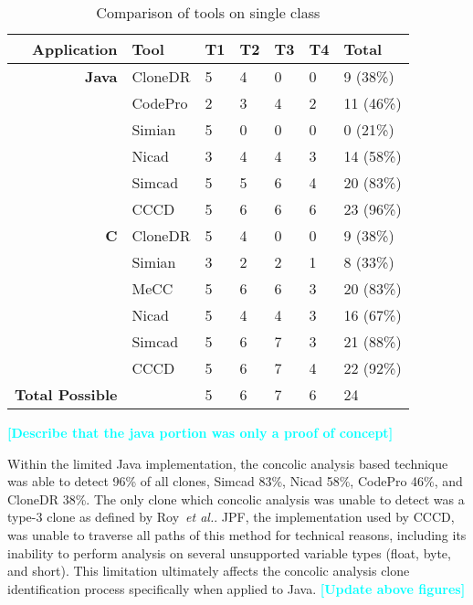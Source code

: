 \documentclass[smallextended]{svjour3}       %
\newcommand{\todo}[1]{\textcolor{cyan}{\textbf{[#1]}}}
\begin{document}
\begin{table}[thb!]
\begin{center}
\caption{Comparison of tools on single class}
\label{table:singleclasscomparisionexample}
\begin{tabular}{r||l|l|l|l|l|l}
\bfseries Application & \bfseries Tool & \bfseries T1 & \bfseries T2 & \bfseries T3 & \bfseries  T4 & \bfseries  Total \\ \hline\hline
  \bfseries Java & CloneDR & 5 & 4 & 0 & 0 & 9 (38\%) \\ \cline{2-7}
   & CodePro &  2 & 3 & 4 & 2 & 11 (46\%) \\ \cline{2-7}
& Simian &  5 & 0 & 0 & 0 & 0 (21\%) \\ \cline{2-7}
& Nicad &  3 & 4 & 4 & 3 & 14 (58\%) \\ \cline{2-7}
& Simcad &  5 & 5 & 6 & 4 & 20 (83\%) \\ \cline{2-7}
 & CCCD  & 5 & 6 & 6 & 6  & 23 (96\%)\\
  \hline
 \bfseries C & CloneDR & 5 & 4 & 0 & 0 & 9 (38\%) \\ \cline{2-7}
   & Simian  & 3 & 2 & 2 & 1 & 8 (33\%) \\ \cline{2-7}
   & MeCC  & 5 & 6 & 6 & 3 & 20 (83\%) \\ \cline{2-7}
& Nicad &  5 & 4 & 4 & 3 & 16 (67\%) \\ \cline{2-7}
& Simcad &  5 & 6 & 7 & 3 & 21 (88\%) \\ \cline{2-7}
 & CCCD  & 5 & 6 & 7 & 4  & 22 (92\%)\\

  \hline
\bfseries Total Possible & & 5 & 6 & 7 & 6 & 24 \\ %

\end{tabular}

\end{center}
\end{table}

\todo{Describe that the java portion was only a proof of concept}


Within the limited Java implementation, the concolic analysis based technique was able to detect 96\% of all clones, Simcad 83\%, Nicad 58\%, CodePro 46\%, and CloneDR 38\%. The only clone which concolic analysis was unable to detect was a type-3 clone as defined by Roy~\emph{et al.}. JPF, the implementation used by CCCD, was unable to traverse all paths of this method for technical reasons, including its inability to perform analysis on several unsupported variable types (float, byte, and short). This limitation ultimately affects the concolic analysis clone identification process specifically when applied to Java.
\todo{Update above figures}
\end{document}
